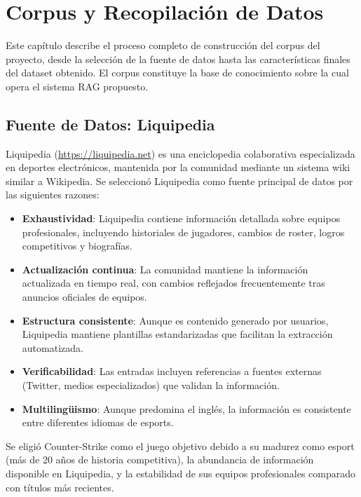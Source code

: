 ﻿\chapter{Corpus y Recopilación de Datos}
\label{ch:corpus_datos}

Este capítulo describe el proceso completo de construcción del corpus del proyecto, desde la selección de la fuente de datos hasta las características finales del dataset obtenido. El corpus constituye la base de conocimiento sobre la cual opera el sistema RAG propuesto.

\section{Fuente de Datos: Liquipedia}

Liquipedia (\url{https://liquipedia.net}) es una enciclopedia colaborativa especializada en deportes electrónicos, mantenida por la comunidad mediante un sistema wiki similar a Wikipedia. Se seleccionó Liquipedia como fuente principal de datos por las siguientes razones:

\begin{itemize}
    \item \textbf{Exhaustividad}: Liquipedia contiene información detallada sobre equipos profesionales, incluyendo historiales de jugadores, cambios de roster, logros competitivos y biografías.
    
    \item \textbf{Actualización continua}: La comunidad mantiene la información actualizada en tiempo real, con cambios reflejados frecuentemente tras anuncios oficiales de equipos.
    
    \item \textbf{Estructura consistente}: Aunque es contenido generado por usuarios, Liquipedia mantiene plantillas estandarizadas que facilitan la extracción automatizada.
    
    \item \textbf{Verificabilidad}: Las entradas incluyen referencias a fuentes externas (Twitter, medios especializados) que validan la información.
    
    \item \textbf{Multilingüismo}: Aunque predomina el inglés, la información es consistente entre diferentes idiomas de esports.
\end{itemize}

Se eligió Counter-Strike como el juego objetivo debido a su madurez como esport (más de 20 años de historia competitiva), la abundancia de información disponible en Liquipedia, y la estabilidad de sus equipos profesionales comparado con títulos más recientes.

